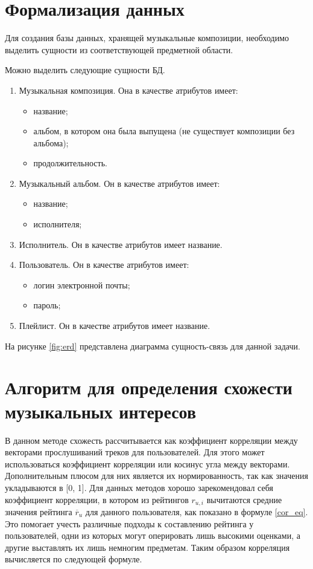 \documentclass[a4paper,14pt]{extreport}
\begin{document}
\section{Формализация данных}
Для создания базы данных, хранящей музыкальные композиции, необходимо выделить сущности из соответствующей предметной области.

Можно выделить следующие сущности БД.
\begin{enumerate}
\item Музыкальная композиция. Она в качестве атрибутов имеет:
\begin{itemize}
\item название;
\item альбом, в котором она была выпущена (не существует композиции без альбома);
\item продолжительность.
\end{itemize}

\item Музыкальный альбом. Он в качестве атрибутов имеет:
\begin{itemize}
\item название;
\item исполнителя; 
\end{itemize}

\item Исполнитель. Он в качестве атрибутов имеет название.

\item Пользователь. Он в качестве атрибутов имеет:
\begin{itemize}
\item логин электронной почты;
\item пароль; 
\end{itemize}

\item Плейлист. Он в качестве атрибутов имеет название.
\end{enumerate}

На рисунке \ref{fig:erd} представлена диаграмма сущность-связь для данной задачи.




\section{Алгоритм для определения схожести музыкальных интересов}\label{ac}

В данном методе \cite{bib:1} схожесть рассчитывается как коэффициент корреляции между векторами прослушиваний треков для пользователей. Для этого может использоваться коэффициент корреляции или косинус угла между векторами. Дополнительным плюсом для них является их нормированность, так как значения укладываются в [0, 1]. Для данных методов хорошо зарекомендовал себя коэффициент корреляции, в котором из рейтингов $r_{u,i}$ вычитаются средние значения рейтинга  $\displaystyle \overline{r}_u$ для данного пользователя, как показано в формуле \ref{cor_eq}. Это помогает учесть различные подходы к составлению рейтинга у пользователей, одни из которых могут оперировать лишь высокими оценками, а другие выставлять их лишь немногим предметам. Таким образом корреляция вычисляется по следующей формуле.
\end{document}
